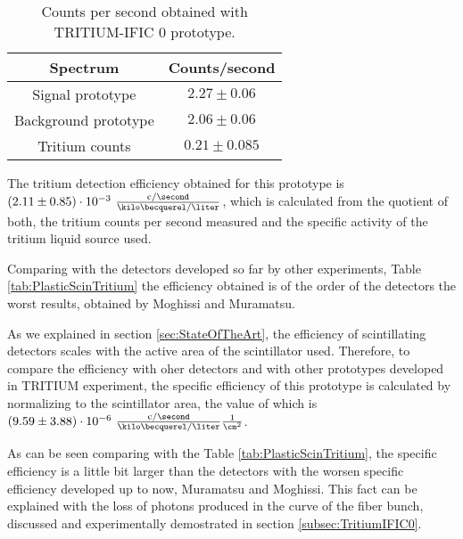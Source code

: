 \begin{table}[h]
\begin{center}
\begin{tabular}{|c|c|}
\hline
Spectrum & Counts/second\\
\hline \hline \hline
Signal prototype & $2.27 \pm 0.06$ \\ \hline
Background prototype & $2.06 \pm 0.06$ \\ \hline
Tritium counts & $0.21 \pm 0.085$ \\ \hline
\end{tabular}
\caption{Counts per second obtained with TRITIUM-IFIC 0 prototype.}
\label{tab:CountsPerSecondTRITIUMIFIC0}
\end{center}
\end{table}

The tritium detection efficiency obtained for this prototype is $(2.11 \pm 0.85)\cdot{} 10^{-3}~ \frac{\text{c}/\second}{\kilo\becquerel/\liter}$, which is calculated from the quotient of both, the tritium counts per second measured and the specific activity of the tritium liquid source used.

Comparing with the detectors developed so far by other experiments, Table \ref{tab:PlasticScinTritium} the efficiency obtained is of the order of the detectors the worst results, obtained by Moghissi and Muramatsu. 

As we explained in section \ref{sec:StateOfTheArt}, the efficiency of scintillating detectors scales with the active area of the scintillator used. Therefore, to compare the efficiency with oher detectors and with other prototypes developed in TRITIUM experiment, the specific efficiency of this prototype is calculated by normalizing to the scintillator area, the value of which is $(9.59 \pm 3.88)\cdot{} 10^{-6}~ \frac{\text{c}/\second}{\kilo\becquerel/\liter}\frac{1}{\cm^{2}}$.

As can be seen comparing with the Table \ref{tab:PlasticScinTritium}, the specific efficiency is a little bit larger than the detectors with the worsen specific efficiency developed up to now, Muramatsu and Moghissi. This fact can be explained with the loss of photons produced in the curve of the fiber bunch, discussed and experimentally demostrated in section \ref{subsec:TritiumIFIC0}.